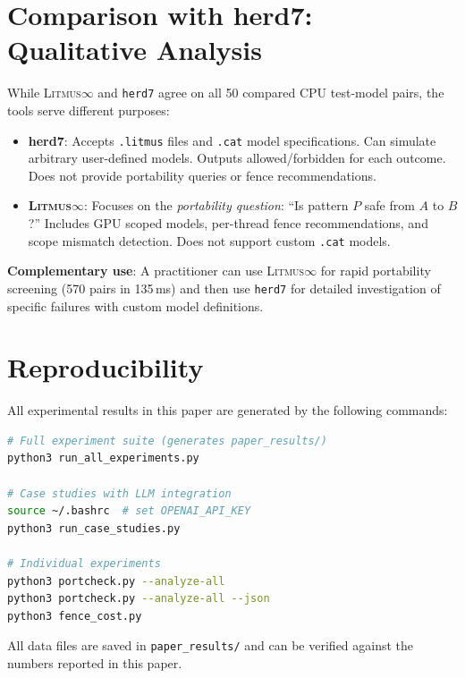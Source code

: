 \documentclass[10pt]{article}
\newcommand{\litmus}{\textsc{Litmus$\infty$}}
\begin{document}
\section{Comparison with herd7: Qualitative Analysis}
\label{app:herd7-comparison}

While \litmus{} and \texttt{herd7} agree on all 50 compared CPU
test-model pairs, the tools serve different purposes:

\begin{itemize}[nosep]
\item \textbf{herd7}: Accepts \texttt{.litmus} files and \texttt{.cat}
      model specifications. Can simulate arbitrary user-defined models.
      Outputs allowed/forbidden for each outcome. Does not provide
      portability queries or fence recommendations.
\item \textbf{\litmus{}}: Focuses on the \emph{portability question}:
      ``Is pattern $P$ safe from $A$ to $B$?'' Includes GPU scoped
      models, per-thread fence recommendations, and scope mismatch
      detection. Does not support custom \texttt{.cat} models.
\end{itemize}

\textbf{Complementary use}: A practitioner can use \litmus{} for
rapid portability screening (570 pairs in 135\,ms) and then use
\texttt{herd7} for detailed investigation of specific failures with
custom model definitions.

\section{Reproducibility}
\label{app:reproducibility}

All experimental results in this paper are generated by the following
commands:

\begin{lstlisting}[language=bash, caption={Reproducing all experiments}]
# Full experiment suite (generates paper_results/)
python3 run_all_experiments.py

# Case studies with LLM integration
source ~/.bashrc  # set OPENAI_API_KEY
python3 run_case_studies.py

# Individual experiments
python3 portcheck.py --analyze-all
python3 portcheck.py --analyze-all --json
python3 fence_cost.py
\end{lstlisting}

All data files are saved in \texttt{paper\_results/} and can be
verified against the numbers reported in this paper.
\end{document}
